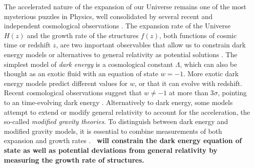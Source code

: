 The accelerated nature of the expansion of our Universe remains one of the most 
mysterious puzzles in Physics, %
well consolidated by several recent and 
independent cosmological observations 
\cite{planckcollaborationPlanck2018Results2020,
broutPantheonAnalysisCosmological2022,
rubinUnionUNITYCosmology2025,
descollaborationDarkEnergySurvey2024,
desicollaborationDESIDR2Results2025}.
The expansion rate of the Universe $H(z)$ and the growth rate of the structures $f(z)$, 
both functions of cosmic time or redshift $z$, 
are two important observables that allow us to constrain dark energy models or alternatives to general relativity 
as potential solutions \cite{houCosmologicalProbesStructure2023}.%
The simplest model of \emph{dark energy} is a cosmological constant $\Lambda$, 
which can also be thought as an exotic fluid with an equation of state $w=-1$. 
More exotic dark energy models predict different values for $w$, or that it can evolve with redshift.  
Recent cosmological observations suggest that $w \neq -1$ at 
more than 3$\sigma$, pointing to an time-evolving dark energy 
\cite{desicollaborationDESIDR2Results2025}. 
Alternatively to dark energy, some models attempt to extend or modify general relativity 
to account for the acceleration, the so-called 
\emph{modified gravity theories}. %
To distinguish between dark energy and modified gravity models, it is essential to 
combine measurements of both expansion and growth rates \cite{ishakModifiedGravityConstraints2025}. 
\textbf{\projacro\ will constrain the dark energy equation of state as well as potential deviations 
from general relativity by measuring the growth rate of structures.}


